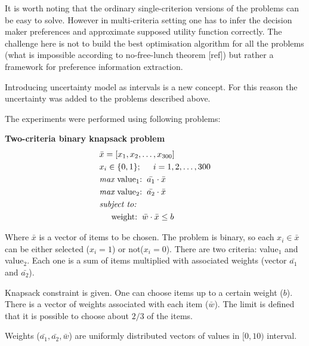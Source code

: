 It is worth noting that the ordinary single-criterion versions of the problems
can be easy to solve. However in multi-criteria setting one has to infer the
decision maker preferences and approximate supposed utility function
correctly. The challenge here is not to build the best optimisation algorithm
for all the problems (what is impossible according to no-free-lunch theorem
[ref]) but rather a framework for preference information extraction.

Introducing uncertainty model as intervals is a new concept. For this reason
the uncertainty was added to the problems described above.

The experiments were performed using following problems:
\begin{description}
  \item{\textbf{Two-criteria binary knapsack problem}}
    \begin{align*}
      & \bar{x} = [x_1, x_2, \dots, x_{300}]  \\
      & x_i \in \{0, 1\};  \hspace{0.5cm} i = 1, 2, \dots, 300 \\
      & \textit{max}\text{ value$_1$:} \hspace{0.2cm} \bar{a_1} \cdot \bar{x} \\
      & \textit{max}\text{ value$_2$:} \hspace{0.2cm} \bar{a_2} \cdot \bar{x} \\
      & \textit{subject to:} \\
      & \hspace{0.5cm} \text{weight:} \hspace{0.2cm} \bar{w} \cdot \bar{x} \leq b
    \end{align*}
    
    Where $\bar{x}$ is a vector of items to be chosen. The problem is binary,
    so each $x_i \in \bar{x}$ can be either selected ($x_i = 1$) or not($x_i
    = 0$). There are two criteria: value$_1$ and value$_2$. Each one is a sum
    of items multiplied with associated weights (vector $\bar{a_1}$ and
    $\bar{a_2}$).

    Knapsack constraint is given. One can choose items up to a certain weight
    ($b$). There is a vector of weights associated with each item
    ($\bar{w}$). The limit is defined that it is possible to choose about
    $2/3$ of the items.

    Weights ($\bar{a_1}, \bar{a_2}, \bar{w}$) are uniformly distributed
    vectors of values in $[0,10)$ interval.



\end{description}
